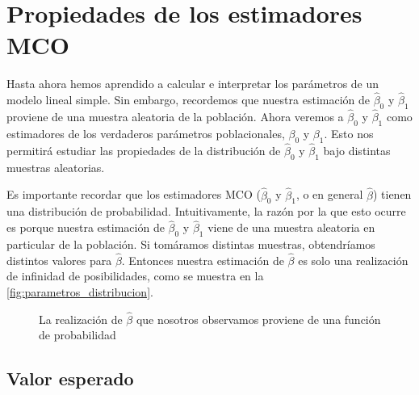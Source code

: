 \documentclass{report}\usepackage[]{graphicx}\usepackage[]{color}
\begin{document}
\section{Propiedades de los estimadores MCO}

Hasta ahora hemos aprendido a calcular e interpretar los parámetros de un modelo lineal simple. Sin embargo, recordemos que nuestra estimación de $\hat\beta_0$ y $\hat\beta_1$ proviene de una muestra aleatoria de la población.
Ahora veremos a $\hat\beta_0$ y $\hat\beta_1$ como estimadores de los verdaderos parámetros poblacionales, $\beta_0$ y $\beta_1$.
Esto nos permitirá estudiar las propiedades de la distribución de $\hat\beta_0$ y $\hat\beta_1$ bajo distintas muestras aleatorias.

Es importante recordar que los estimadores MCO ($\hat\beta_0$ y $\hat\beta_1$, o en general $\hat\beta$) tienen una distribución de probabilidad.
Intuitivamente, la razón por la que esto ocurre es porque nuestra estimación de $\hat\beta_0$ y $\hat\beta_1$ viene de una muestra aleatoria en particular de la población.
Si tomáramos distintas muestras, obtendríamos distintos valores para $\hat\beta$.
Entonces nuestra estimación de $\hat\beta$ es solo una realización de infinidad de posibilidades, como se muestra en la \autoref{fig:parametros_distribucion}.

\begin{figure}[htb]
  \centering
  \caption{La realización de $\hat\beta$ que nosotros observamos proviene de una función de probabilidad}
  \label{fig:parametros_distribucion}
\end{figure}%

\subsection{Valor esperado}
\end{document}
